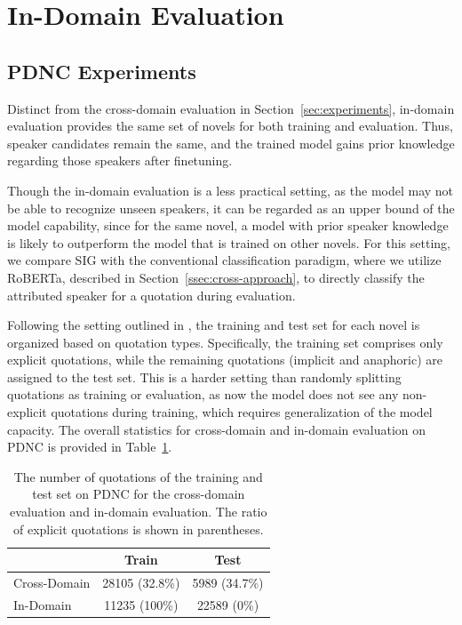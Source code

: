 \documentclass[letterpaper]{article} %
\begin{document}
\section{In-Domain Evaluation}



\subsection{PDNC Experiments}
Distinct from the cross-domain evaluation in Section~\ref{sec:experiments}, in-domain evaluation provides the same set of novels for both training and evaluation. Thus, speaker candidates remain the same, and the trained model gains prior knowledge regarding those speakers after finetuning.

Though the in-domain evaluation is a less practical setting, as the model may not be able to recognize unseen speakers, it can be regarded as an upper bound of the model capability, since for the same novel, a model with prior speaker knowledge is likely to outperform the model that is trained on other novels.
For this setting, we compare SIG with the conventional classification paradigm, where we utilize RoBERTa, described in Section~\ref{ssec:cross-approach}, to directly classify the attributed speaker for a quotation during evaluation.

Following the setting outlined in \citep{DBLP:conf/lrec/VishnubhotlaHH22}, the training and test set for each novel is organized based on quotation types. Specifically, the training set comprises only explicit quotations, while the remaining quotations (implicit and anaphoric) are assigned to the test set. This is a harder setting than randomly splitting quotations as training or evaluation, as now the model does not see any non-explicit quotations during training, which requires generalization of the model capacity. The overall statistics for cross-domain and in-domain evaluation on PDNC is provided in Table~\ref{tab:stats}.

\begin{table}[htbp!]
    \centering
    \begin{tabular}{l|cc}
       \toprule
       & \textbf{Train} &\textbf{Test}\\
       \midrule  
       Cross-Domain & 28105 (32.8\%) & 5989 (34.7\%) \\
       In-Domain & 11235 (100\%) & 22589 (0\%) \\
       \bottomrule
    \end{tabular}
    \caption{The number of quotations of the training and test set on PDNC for the cross-domain evaluation and in-domain evaluation. The ratio of explicit quotations is shown in parentheses.}
    \label{tab:stats}
\end{table}
\end{document}
